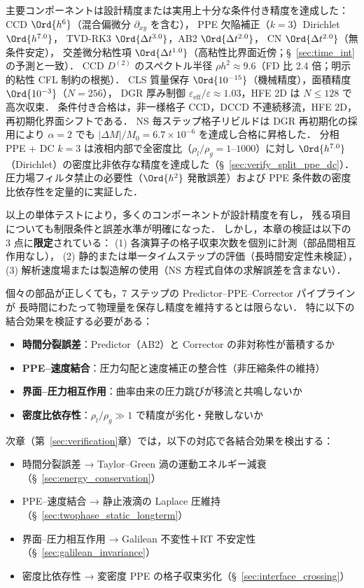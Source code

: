 \begin{tcolorbox}[resultbox, title={コンポーネント検証の総括}]
主要コンポーネントは設計精度または実用上十分な条件付き精度を達成した：
CCD $\Ord{h^6}$（混合偏微分 $\partial_{xy}$ を含む），
PPE 欠陥補正（$k{=}3$）Dirichlet $\Ord{h^{7.0}}$，
TVD-RK3 $\Ord{\Delta t^{3.0}}$，AB2 $\Ord{\Delta t^{2.0}}$，
CN $\Ord{\Delta t^{2.0}}$（無条件安定），
交差微分粘性項 $\Ord{\Delta t^{1.0}}$（高粘性比界面近傍；§~\ref{sec:time_int} の予測と一致）．
CCD $D^{(2)}$ のスペクトル半径 $\rho h^2 \approx 9.6$（FD 比 2.4 倍；明示的粘性 CFL 制約の根拠）．
CLS 質量保存 $\Ord{10^{-15}}$（機械精度），面積精度 $\Ord{10^{-3}}$（$N{=}256$），
DGR 厚み制御 $\varepsilon_{\mathrm{eff}}/\varepsilon \approx 1.03$，HFE 2D は $N\le128$ で高次収束．
条件付き合格は，非一様格子 CCD，DCCD 不連続移流，HFE 2D，
再初期化界面シフトである．
NS 毎ステップ格子リビルドは DGR 再初期化の採用により
$\alpha{=}2$ でも $|\Delta M|/M_0 = 6.7 \times 10^{-6}$ を達成し合格に昇格した．
分相 PPE + DC $k{=}3$ は液相内部で全密度比（$\rho_l/\rho_g = 1$--$1000$）に対し
$\Ord{h^{7.0}}$（Dirichlet）の密度比非依存な精度を達成した（§~\ref{sec:verify_split_ppe_dc}）．
圧力場フィルタ禁止の必要性（$\Ord{h^2}$ 発散誤差）および
PPE 条件数の密度比依存性を定量的に実証した．
\end{tcolorbox}

以上の単体テストにより，多くのコンポーネントが設計精度を有し，
残る項目についても制限条件と誤差水準が明確になった．
しかし，本章の検証は以下の 3 点に\textbf{限定}されている：
(1) 各演算子の格子収束次数を個別に計測（部品間相互作用なし），
(2) 静的または単一タイムステップの評価（長時間安定性未検証），
(3) 解析速度場または製造解の使用（NS 方程式自体の求解誤差を含まない）．

個々の部品が正しくても，7 ステップの Predictor--PPE--Corrector パイプラインが
長時間にわたって物理量を保存し精度を維持するとは限らない．
特に以下の結合効果を検証する必要がある：
\begin{itemize}[noitemsep]
  \item \textbf{時間分裂誤差}：Predictor（AB2）と Corrector の非対称性が蓄積するか
  \item \textbf{PPE--速度結合}：圧力勾配と速度補正の整合性（非圧縮条件の維持）
  \item \textbf{界面--圧力相互作用}：曲率由来の圧力跳びが移流と共鳴しないか
  \item \textbf{密度比依存性}：$\rho_l/\rho_g \gg 1$ で精度が劣化・発散しないか
\end{itemize}
次章（第~\ref{sec:verification}章）では，以下の対応で各結合効果を検出する：
\begin{itemize}[noitemsep]
  \item 時間分裂誤差 → Taylor--Green 渦の運動エネルギー減衰（§~\ref{sec:energy_conservation}）
  \item PPE--速度結合 → 静止液滴の Laplace 圧維持（§~\ref{sec:twophase_static_longterm}）
  \item 界面--圧力相互作用 → Galilean 不変性＋RT 不安定性（§~\ref{sec:galilean_invariance}）
  \item 密度比依存性 → 変密度 PPE の格子収束劣化（§~\ref{sec:interface_crossing}）
\end{itemize}
